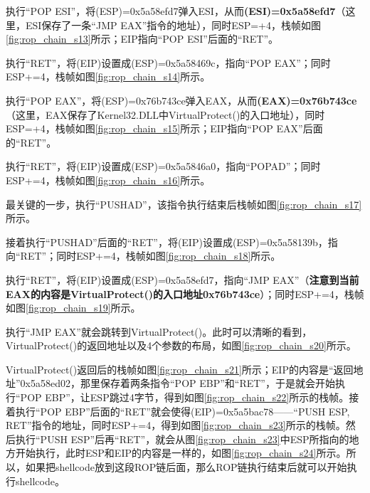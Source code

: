 \documentclass[bachelor]{thesis-uestc}
\begin{document}
执行``POP ESI''，将(ESP)=0x5a58efd7弹入ESI，从而\textbf{(ESI)=0x5a58efd7}（这里，ESI保存了一条``JMP EAX''指令的地址），同时ESP=+4，栈帧如图\ref{fig:rop_chain_s13}所示；EIP指向``POP ESI''后面的``RET''。\par

执行``RET''，将(EIP)设置成(ESP)=0x5a58469c，指向``POP EAX''；同时ESP+=4，栈帧如图\ref{fig:rop_chain_s14}所示。\par

执行``POP EAX''，将(ESP)=0x76b743ce弹入EAX，从而\textbf{(EAX)=0x76b743ce}（这里，EAX保存了Kernel32.DLL中VirtualProtect()的入口地址），同时ESP=+4，栈帧如图\ref{fig:rop_chain_s15}所示；EIP指向``POP EAX''后面的``RET''。\par

执行``RET''，将(EIP)设置成(ESP)=0x5a5846a0，指向``POPAD''；同时ESP+=4，栈帧如图\ref{fig:rop_chain_s16}所示。\par

最关键的一步，执行``PUSHAD''，该指令执行结束后栈帧如图\ref{fig:rop_chain_s17}所示。\par

接着执行``PUSHAD''后面的``RET''，将(EIP)设置成(ESP)=0x5a58139b，指向``RET''；同时ESP+=4，栈帧如图\ref{fig:rop_chain_s18}所示。\par

执行``RET''，将(EIP)设置成(ESP)=0x5a58efd7，指向``JMP EAX''（\textbf{注意到当前EAX的内容是VirtualProtect()的入口地址0x76b743ce}）；同时ESP+=4，栈帧如图\ref{fig:rop_chain_s19}所示。\par

执行``JMP EAX''就会跳转到VirtualProtect()。此时可以清晰的看到，VirtualProtect()的返回地址以及4个参数的布局，如图\ref{fig:rop_chain_s20}所示。\par

VirtualProtect()返回后的栈帧如图\ref{fig:rop_chain_s21}所示；EIP的内容是``返回地址''0x5a58ed02，那里保存着两条指令``POP EBP''和``RET''，于是就会开始执行``POP EBP''，让ESP跳过4字节，得到如图\ref{fig:rop_chain_s22}所示的栈帧。接着执行``POP EBP''后面的``RET''就会使得(EIP)=0x5a5bac78——``PUSH ESP, RET''指令的地址，同时ESP+=4，得到如图\ref{fig:rop_chain_s23}所示的栈帧。然后执行``PUSH ESP''后再``RET''，就会从图\ref{fig:rop_chain_s23}中ESP所指向的地方开始执行，此时ESP和EIP的内容是一样的，如图\ref{fig:rop_chain_s24}所示。所以，如果把shellcode放到这段ROP链后面，那么ROP链执行结束后就可以开始执行shellcode。\par
\end{document}
